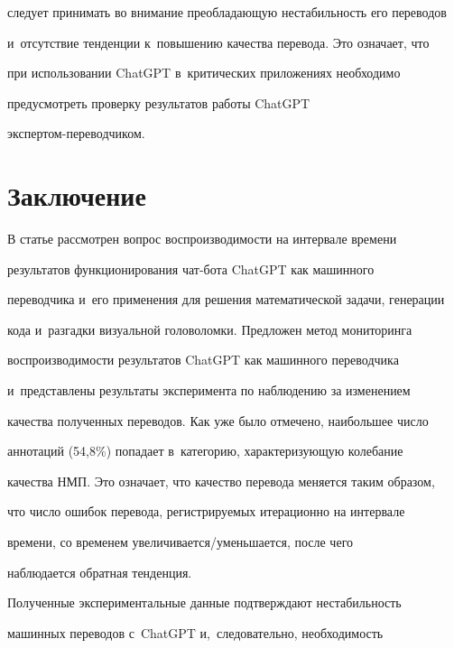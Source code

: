 следует принимать во внимание пре\-об\-ла\-да\-ющую не\-ста\-биль\-ность его переводов 


и~отсутствие тенденции к~повышению качества перевода. Это означает, что 


при использовании \mbox{ChatGPT} в~критических приложениях необходимо 


предусмот\-реть проверку результатов работы \mbox{ChatGPT}  


экс\-пер\-том-пе\-ре\-вод\-чи\-ком.





\section{Заключение}


   


   В статье рассмотрен вопрос вос\-про\-из\-во\-ди\-мости на интервале времени 


результатов функционирования чат-бо\-та \mbox{ChatGPT} как машинного 


переводчика и~его применения для решения математической задачи, генерации 


кода и~разгадки визуальной го\-ло\-во\-лом\-ки. Предложен метод мониторинга 


вос\-про\-из\-во\-ди\-мости результатов \mbox{ChatGPT} как машинного переводчика 


и~пред\-став\-ле\-ны результаты эксперимента по наблюдению за изменением 


качества полученных переводов. Как уже было отмечено, наибольшее чис\-ло 


аннотаций (54,8\%) попадает в~категорию, ха\-рак\-те\-ри\-зу\-ющую колебание 


качества НМП. Это означает, что качество перевода меняется таким образом, 


что чис\-ло ошибок перевода, ре\-гист\-ри\-ру\-емых итерационно на интервале 


времени, со временем уве\-ли\-чи\-ва\-ет\-ся\!/\!умень\-ша\-ет\-ся, после чего 


наблюдается об\-рат\-ная тенденция. 


   


   Полученные экспериментальные данные под\-тверж\-да\-ют не\-ста\-биль\-ность 


машинных переводов с~\mbox{ChatGPT} и,~следовательно, не\-об\-хо\-ди\-мость 


